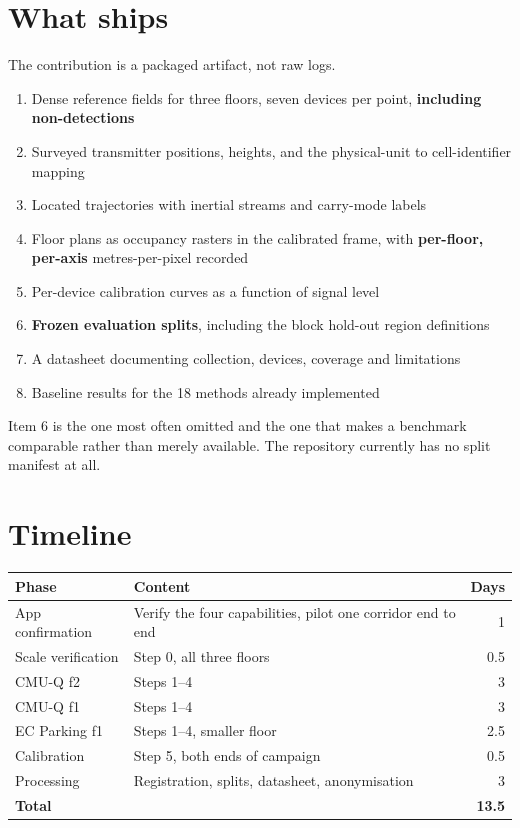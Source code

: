 \documentclass[11pt,a4paper]{article}
\begin{document}
\section{What ships}

The contribution is a packaged artifact, not raw logs.

\begin{enumerate}
\item Dense reference fields for three floors, seven devices per point, \textbf{including
non-detections}
\item Surveyed transmitter positions, heights, and the physical-unit to cell-identifier
mapping
\item Located trajectories with inertial streams and carry-mode labels
\item Floor plans as occupancy rasters in the calibrated frame, with \textbf{per-floor,
per-axis} metres-per-pixel recorded
\item Per-device calibration curves as a function of signal level
\item \textbf{Frozen evaluation splits}, including the block hold-out region definitions
\item A datasheet documenting collection, devices, coverage and limitations
\item Baseline results for the 18 methods already implemented
\end{enumerate}

Item 6 is the one most often omitted and the one that makes a benchmark comparable rather
than merely available. The repository currently has no split manifest at all.

\section{Timeline}

\begin{center}\small
\begin{tabular}{@{}llr@{}}
\toprule
Phase & Content & Days \\ \midrule
App confirmation & Verify the four capabilities, pilot one corridor end to end & 1 \\
Scale verification & Step 0, all three floors & 0.5 \\
CMU-Q f2 & Steps 1--4 & 3 \\
CMU-Q f1 & Steps 1--4 & 3 \\
EC Parking f1 & Steps 1--4, smaller floor & 2.5 \\
Calibration & Step 5, both ends of campaign & 0.5 \\
Processing & Registration, splits, datasheet, anonymisation & 3 \\
\midrule
\textbf{Total} & & \textbf{13.5} \\
\bottomrule
\end{tabular}
\end{center}
\end{document}
